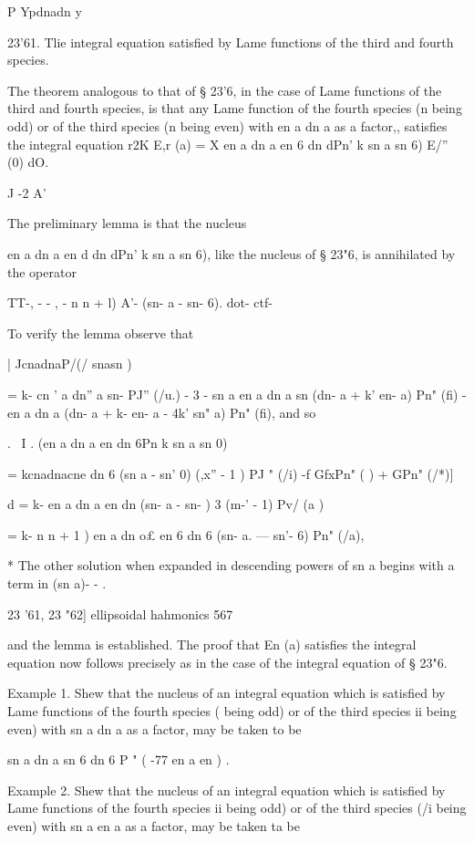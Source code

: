 {{{{{{{{P Ypdnadn y 

23'61. Tlie integral equation satisfied by Lame functions of the third and 
fourth species. 

The theorem analogous to that of § 23'6, in the case of Lame functions of 
the third and fourth species, is that any Lame function of the fourth species 
(n being odd) or of the third species (n being even) with en a dn a as a factor,, 
satisfies the integral equation 
r2K 
E,r (a) = X en a dn a en 6 dn dPn'  k sn a sn 6) E/'' (0) dO. 

J -2 A' 

The preliminary lemma is that the nucleus 

en a dn a en d dn dPn'  k sn a sn 6), 
like the nucleus of § 23"6, is annihilated by the operator 

TT-, -  - , - n  n + l) A'- (sn- a - sn- 6). 
dot- ctf- 

To verify the lemma observe that 

| JcnadnaP/(/ snasn )  

= k- cn ' a dn'' a sn-  PJ'' (/u.) - 3 - sn a en a dn a sn (dn- a  + k' en- a) Pn" (fi) 
- en a dn a (dn- a + k- en- a - 4k'  sn" a) Pn" (fi), 
and so 

. \  I . (en a dn a en   dn 6Pn  k sn a sn 0)\ 

= kcnadnacne dn 6 (sn  a - sn'  0)  (,x'' - 1 ) PJ " (/i) -f GfxPn" ( ) + GPn" (/*)] 

d  
= k- en a dn a en   dn   (sn- a - sn-  )   3  (m-' - 1) Pv/ (a )  

= k- n  n + 1 ) en a dn o£ en 6 dn 6 (sn- a. — sn'- 6) Pn" (/a), 

* The other solution when expanded in descending powers of sn a begins with a term in 
(sn a)- - . 



23 '61, 23 "62] ellipsoidal hahmonics 567 

and the lemma is established. The proof that En  (a) satisfies the integral 
equation now follows precisely as in the case of the integral equation of § 23"6. 

Example 1. Shew that the nucleus of an integral equation which is satisfied by Lame 
functions of the fourth species (  being odd) or of the third species  ii being even) with 
sn a dn a as a factor, may be taken to be 

sn a dn a sn 6 dn 6 P " ( -77 en a en   ) . 

Example 2. Shew that the nucleus of an integral equation which is satisfied by Lame 
functions of the fourth species  ii being odd) or of the third species (/i being even) with 
sn a en a as a factor, may be taken ta be 

}}}}}}}}
